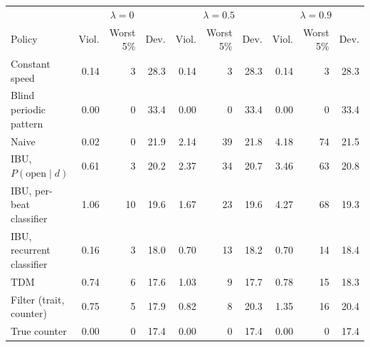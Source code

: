 \begin{tabular}{lrrrrrrrrr}
\toprule
 & \multicolumn{3}{c}{$\lambda=0$} & \multicolumn{3}{c}{$\lambda=0.5$} & \multicolumn{3}{c}{$\lambda=0.9$} \\
Policy & Viol. & Worst 5\% & Dev. & Viol. & Worst 5\% & Dev. & Viol. & Worst 5\% & Dev. \\
\midrule
Constant speed & 0.14 & 3 & 28.3 & 0.14 & 3 & 28.3 & 0.14 & 3 & 28.3 \\
Blind periodic pattern & 0.00 & 0 & 33.4 & 0.00 & 0 & 33.4 & 0.00 & 0 & 33.4 \\
Naive & 0.02 & 0 & 21.9 & 2.14 & 39 & 21.8 & 4.18 & 74 & 21.5 \\
IBU, $P(\mathrm{open}\mid d)$ & 0.61 & 3 & 20.2 & 2.37 & 34 & 20.7 & 3.46 & 63 & 20.8 \\
IBU, per-beat classifier & 1.06 & 10 & 19.6 & 1.67 & 23 & 19.6 & 4.27 & 68 & 19.3 \\
IBU, recurrent classifier & 0.16 & 3 & 18.0 & 0.70 & 13 & 18.2 & 0.70 & 14 & 18.4 \\
TDM & 0.74 & 6 & 17.6 & 1.03 & 9 & 17.7 & 0.78 & 15 & 18.3 \\
Filter (trait, counter) & 0.75 & 5 & 17.9 & 0.82 & 8 & 20.3 & 1.35 & 16 & 20.4 \\
True counter & 0.00 & 0 & 17.4 & 0.00 & 0 & 17.4 & 0.00 & 0 & 17.4 \\
\bottomrule
\end{tabular}
